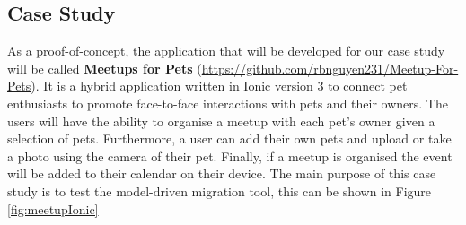 \documentclass[conference]{IEEEtran}
\begin{document}
\subsection{Case Study}
As a proof-of-concept, the application that will be developed for our case study will be called \textbf{Meetups for Pets} (\url{https://github.com/rbnguyen231/Meetup-For-Pets}). It is a hybrid application written
in Ionic version 3 to connect pet enthusiasts to promote face-to-face interactions with pets and their owners. The users will have the ability to organise a meetup with each pet’s owner given a selection of pets. Furthermore, a user can add their own pets and upload or take a photo using the camera of their pet. Finally,
if a meetup is organised the event will be added to their calendar on their device. The main purpose of this case study is to test the model-driven migration tool, this can be shown in Figure \ref{fig:meetupIonic}
\end{document}
